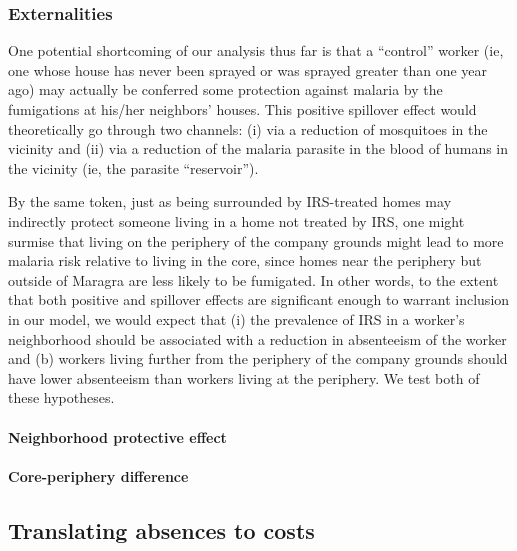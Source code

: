 \documentclass[]{article}
\let\oldparagraph\paragraph
\renewcommand{\paragraph}[1]{\oldparagraph{#1}\mbox{}}
\begin{document}
\subsubsection{Externalities}\label{externalities}

One potential shortcoming of our analysis thus far is that a ``control''
worker (ie, one whose house has never been sprayed or was sprayed
greater than one year ago) may actually be conferred some protection
against malaria by the fumigations at his/her neighbors' houses. This
positive spillover effect would theoretically go through two channels:
(i) via a reduction of mosquitoes in the vicinity and (ii) via a
reduction of the malaria parasite in the blood of humans in the vicinity
(ie, the parasite ``reservoir'').

By the same token, just as being surrounded by IRS-treated homes may
indirectly protect someone living in a home not treated by IRS, one
might surmise that living on the periphery of the company grounds might
lead to more malaria risk relative to living in the core, since homes
near the periphery but outside of Maragra are less likely to be
fumigated. In other words, to the extent that both positive and
spillover effects are significant enough to warrant inclusion in our
model, we would expect that (i) the prevalence of IRS in a worker's
neighborhood should be associated with a reduction in absenteeism of the
worker and (b) workers living further from the periphery of the company
grounds should have lower absenteeism than workers living at the
periphery. We test both of these hypotheses.

\paragraph{Neighborhood protective
effect}\label{neighborhood-protective-effect}


\paragraph{Core-periphery difference}\label{core-periphery-difference}


\subsection{Translating absences to
costs}\label{translating-absences-to-costs}
\end{document}

